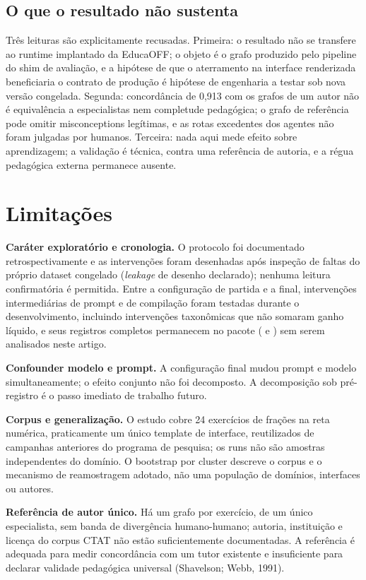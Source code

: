 \documentclass[11pt,a4paper]{article}
\begin{document}
\subsection{O que o resultado não sustenta}

Três leituras são explicitamente recusadas. Primeira: o resultado não se transfere ao runtime implantado da EducaOFF; o objeto é o grafo produzido pelo pipeline do shim de avaliação, e a hipótese de que o aterramento na interface renderizada beneficiaria o contrato de produção é hipótese de engenharia a testar sob nova versão congelada. Segunda: concordância de 0,913 com os grafos de um autor não é equivalência a especialistas nem completude pedagógica; o grafo de referência pode omitir misconceptions legítimas, e as rotas excedentes dos agentes não foram julgadas por humanos. Terceira: nada aqui mede efeito sobre aprendizagem; a validação é técnica, contra uma referência de autoria, e a régua pedagógica externa permanece ausente.

\section{Limitações}
\label{sec:limitacoes}

\textbf{Caráter exploratório e cronologia.} O protocolo foi documentado retrospectivamente e as intervenções foram desenhadas após inspeção de faltas do próprio dataset congelado (\emph{leakage} de desenho declarado); nenhuma leitura confirmatória é permitida. Entre a configuração de partida e a final, intervenções intermediárias de prompt e de compilação foram testadas durante o desenvolvimento, incluindo intervenções taxonômicas que não somaram ganho líquido, e seus registros completos permanecem no pacote ( e ) sem serem analisados neste artigo.

\textbf{Confounder modelo e prompt.} A configuração final mudou prompt e modelo simultaneamente; o efeito conjunto não foi decomposto. A decomposição sob pré-registro é o passo imediato de trabalho futuro.

\textbf{Corpus e generalização.} O estudo cobre 24 exercícios de frações na reta numérica, praticamente um único template de interface, reutilizados de campanhas anteriores do programa de pesquisa; os runs não são amostras independentes do domínio. O bootstrap por cluster descreve o corpus e o mecanismo de reamostragem adotado, não uma população de domínios, interfaces ou autores.

\textbf{Referência de autor único.} Há um grafo por exercício, de um único especialista, sem banda de divergência humano-humano; autoria, instituição e licença do corpus CTAT não estão suficientemente documentadas. A referência é adequada para medir concordância com um tutor existente e insuficiente para declarar validade pedagógica universal (Shavelson; Webb, 1991).
\end{document}
